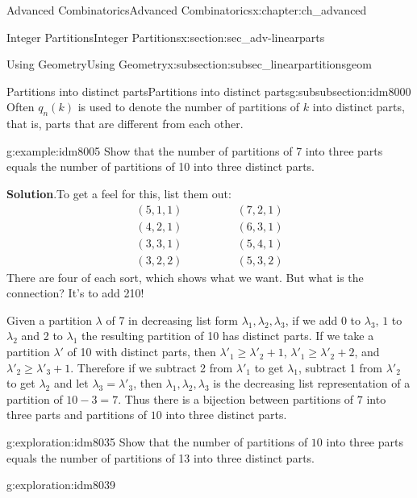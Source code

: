\documentclass[oneside,10pt,]{book}
\numberwithin{equation}{chapter}
\newcommand{\amp}{&}
\begin{document}
\begin{chapterptx}{Advanced Combinatorics}{}{Advanced Combinatorics}{}{}{x:chapter:ch_advanced}
\begin{sectionptx}{Integer Partitions}{}{Integer Partitions}{}{}{x:section:sec_adv-linearparts}
\begin{subsectionptx}{Using Geometry}{}{Using Geometry}{}{}{x:subsection:subsec_linearpartitionsgeom}
\begin{introduction}{}
\end{introduction}%
%
%
\typeout{************************************************}
\typeout{************************************************}
%
\begin{subsubsectionptx}{Partitions into distinct parts}{}{Partitions into distinct parts}{}{}{g:subsubsection:idm8000}
Often \(q_n(k)\) is used to denote the number of partitions of \(k\) into distinct parts, that is, parts that are different from each other.%
\begin{example}{}{g:example:idm8005}%
Show that the number of partitions of 7 into three parts equals the number of partitions of 10 into three distinct parts.%
\par\smallskip%
\noindent\textbf{Solution}.\hypertarget{g:solution:idm8008}{}\quad{}To get a feel for this, list them out:%
\begin{align*}
(5,1,1) \qquad \amp \qquad (7,2,1)\\
(4,2,1) \qquad \amp \qquad (6,3,1)\\
(3,3,1) \qquad \amp \qquad (5,4,1)\\
(3,2,2) \qquad \amp \qquad (5,3,2)
\end{align*}
There are four of each sort, which shows what we want.  But what is the connection?  It's to add 210!%
\par
Given a partition \(\lambda\) of 7 in decreasing list form \(\lambda_1,\lambda_2,\lambda_3\), if we add 0 to \(\lambda_3\), \(1\) to \(\lambda_2\) and 2 to \(\lambda_1\) the resulting partition of 10 has distinct parts. If we take a partition \(\lambda'\) of 10 with distinct parts, then \(\lambda'_1\ge\lambda'_2+1\), \(\lambda'_1\ge\lambda'_2+2\), and \(\lambda'_2\ge \lambda'_3+1\). Therefore if we subtract 2 from \(\lambda'_1\) to get \(\lambda_1\), subtract 1 from \(\lambda'_2\) to get \(\lambda_2\) and let \(\lambda_3= \lambda'_3\), then \(\lambda_1,\lambda_2,\lambda_3\) is the decreasing list representation of a partition of \(10-3=7\). Thus there is a bijection between partitions of \(7\) into three parts and partitions of \(10\) into three distinct parts.%
\end{example}
\begin{exploration}{}{g:exploration:idm8035}%
Show that the number of partitions of \(10\) into three parts equals the number of partitions of 13 into three distinct parts.%
\end{exploration}
\begin{exploration}{}{g:exploration:idm8039}%

\end{exploration}
\end{subsubsectionptx}
\end{subsectionptx}
\end{sectionptx}
\end{chapterptx}
\end{document}
